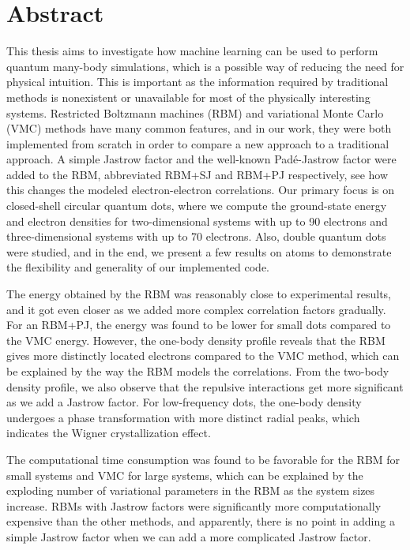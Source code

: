 \section*{Abstract}
This thesis aims to investigate how machine learning can be used to perform quantum many-body simulations, which is a possible way of reducing the need for physical intuition. This is important as the information required by traditional methods is nonexistent or unavailable for most of the physically interesting systems. Restricted Boltzmann machines (RBM) and variational Monte Carlo (VMC) methods have many common features, and in our work, they were both implemented from scratch in order to compare a new approach to a traditional approach. A simple Jastrow factor and the well-known Padé-Jastrow factor were added to the RBM, abbreviated RBM+SJ and RBM+PJ respectively, see how this changes the modeled electron-electron correlations. Our primary focus is on closed-shell circular quantum dots, where we compute the ground-state energy and electron densities for two-dimensional systems with up to 90 electrons and three-dimensional systems with up to 70 electrons. Also, double quantum dots were studied, and in the end, we present a few results on atoms to demonstrate the flexibility and generality of our implemented code.

The energy obtained by the RBM was reasonably close to experimental results, and it got even closer as we added more complex correlation factors gradually. For an RBM+PJ, the energy was found to be lower for small dots compared to the VMC energy. However, the one-body density profile reveals that the RBM gives more distinctly located electrons compared to the VMC method, which can be explained by the way the RBM models the correlations. From the two-body density profile, we also observe that the repulsive interactions get more significant as we add a Jastrow factor. For low-frequency dots, the one-body density undergoes a phase transformation with more distinct radial peaks, which indicates the Wigner crystallization effect.

The computational time consumption was found to be favorable for the RBM for small systems and VMC for large systems, which can be explained by the exploding number of variational parameters in the RBM as the system sizes increase. RBMs with Jastrow factors were significantly more computationally expensive than the other methods, and apparently, there is no point in adding a simple Jastrow factor when we can add a more complicated Jastrow factor. 

